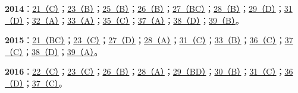 \documentclass[11pt,a4paper]{article}
\begin{document}
\noindent\textbf{2014}：\hyperref[idx-2014-T1-Q21]{21（C）}；\hyperref[idx-2014-T1-Q23]{23（B）}；\hyperref[idx-2014-T1-Q25]{25（B）}；\hyperref[idx-2014-T2-Q26]{26（B）}；\hyperref[idx-2014-T2-Q27]{27（BC）}；\hyperref[idx-2014-T2-Q28]{28（B）}；\hyperref[idx-2014-T2-Q29]{29（D）}；\hyperref[idx-2014-T3-Q31]{31（D）}；\hyperref[idx-2014-T3-Q32]{32（A）}；\hyperref[idx-2014-T3-Q33]{33（A）}；\hyperref[idx-2014-T3-Q35]{35（C）}；\hyperref[idx-2014-T4-Q37]{37（A）}；\hyperref[idx-2014-T4-Q38]{38（D）}；\hyperref[idx-2014-T4-Q39]{39（B）}。\par
\noindent\textbf{2015}：\hyperref[idx-2015-T1-Q21]{21（BC）}；\hyperref[idx-2015-T1-Q23]{23（C）}；\hyperref[idx-2015-T2-Q27]{27（D）}；\hyperref[idx-2015-T2-Q28]{28（A）}；\hyperref[idx-2015-T3-Q31]{31（C）}；\hyperref[idx-2015-T3-Q33]{33（B）}；\hyperref[idx-2015-T4-Q36]{36（C）}；\hyperref[idx-2015-T4-Q37]{37（C）}；\hyperref[idx-2015-T4-Q38]{38（D）}；\hyperref[idx-2015-T4-Q39]{39（A）}。\par
\noindent\textbf{2016}：\hyperref[idx-2016-T1-Q22]{22（C）}；\hyperref[idx-2016-T1-Q23]{23（C）}；\hyperref[idx-2016-T2-Q26]{26（B）}；\hyperref[idx-2016-T2-Q28]{28（A）}；\hyperref[idx-2016-T2-Q29]{29（BD）}；\hyperref[idx-2016-T2-Q30]{30（B）}；\hyperref[idx-2016-T3-Q31]{31（C）}；\hyperref[idx-2016-T4-Q36]{36（D）}；\hyperref[idx-2016-T4-Q37]{37（C）}。\par
{}
\end{document}
